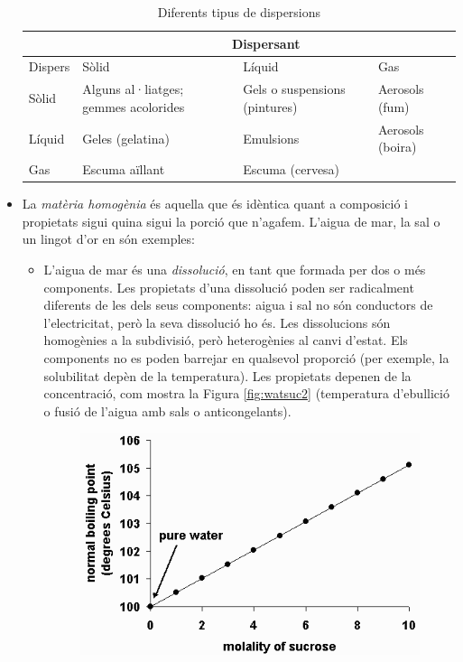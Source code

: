 \begin{itemize}
\begin{table}[h!]
  \begin{center}
    \caption{Diferents tipus de dispersions}
    \label{tab:colloid}
    \begin{tabular}{l|l|l|l}
      & \multicolumn{3}{c}{Dispersant}\\ 
      \hline
      Dispers & Sòlid & Líquid & Gas\\
      \hline
      Sòlid & Alguns al·liatges; gemmes acolorides & Gels o suspensions (pintures) & Aerosols (fum) \\
      Líquid & Geles (gelatina) & Emulsions & Aerosols (boira) \\
      Gas & Escuma aïllant & Escuma (cervesa) & \\
      \hline
    \end{tabular}
  \end{center}
\end{table}
\item La \emph{matèria homogènia} és aquella que és idèntica quant a composició i propietats sigui quina sigui la porció que n'agafem. L'aigua de mar, la sal o un lingot d'or en són exemples:
\begin{itemize}
\item L'aigua de mar és una \emph{dissolució}, en tant que formada per dos o més components. Les propietats d'una dissolució poden ser radicalment diferents de les dels seus components: aigua i sal no són conductors de l'electricitat, però la seva dissolució ho és. Les dissolucions són homogènies a la subdivisió, però heterogènies al canvi d'estat. Els components no es poden barrejar en qualsevol proporció (per exemple, la solubilitat depèn de la temperatura). Les propietats depenen de la concentració, com mostra la Figura \ref{fig:watsuc2} (temperatura d'ebullició o fusió de l'aigua amb sals o anticongelants).
\begin{figure}[h]
\centering
\includegraphics[scale=0.8]{figures/watsuc2.png}

\end{figure}
\end{itemize}
\end{itemize}
